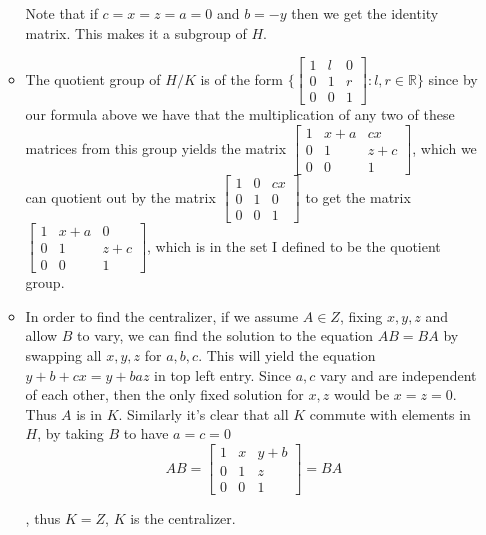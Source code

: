 \documentclass[12pt, letterpaper]{article}
\newcommand{\R}{\mathbb{R}}
\begin{document}
\begin{enumerate}
\begin{itemize}
		Note that if $c=x=z=a=0$ and $b=-y$ then we get the identity matrix.		
		This makes it a subgroup of $H$.
		\item The quotient group of $H / K$ is of the form
		$\{\begin{bmatrix} 1 & l & 0\\ 0 & 1 & r\\ 0 & 0 & 1 \end{bmatrix}: l,r \in \R\}$ since by our formula above we have that the multiplication of 
		any two of these matrices from this group yields the matrix
		$\begin{bmatrix} 1 & x + a & cx\\ 0 & 1 & z+c\\ 0 & 0 &1\end{bmatrix}$, which we can quotient out by the matrix $\begin{bmatrix}
		1 & 0 & cx\\ 0 & 1 & 0\\ 0 & 0 & 1
		\end{bmatrix}$ to get the matrix$\begin{bmatrix} 1 & x + a & 0\\ 0 & 1 & z+c\\ 0 & 0 &1\end{bmatrix}$, which is in the set I defined to be 
		the quotient group.  
		\item In order to find the centralizer, if we assume $A \in Z$, fixing $x,y,z$ and allow $B$ to vary, we can find the solution to the equation $AB = BA$ by swapping all $x,y,z$ for $a,b,c$.  This will yield 
		the equation $y + b+cx = y+baz$ in top left entry.  Since $a,c$ vary and are independent of each other, then the only fixed solution for $x,z$ would be $x=z=0$.  Thus $A$ is in $K$.  Similarly it's clear that all $K$ commute with elements in $H$, by taking $B$ to have $a=c=0$
		$$
			AB = \begin{bmatrix}
		1 & x & y + b\\ 0 & 1 & z\\ 0 & 0 & 1
\end{bmatrix} = BA
		$$
		
		, thus $K = Z$, $K$ is the centralizer.  
	\end{itemize}
\end{enumerate}
\end{document}

